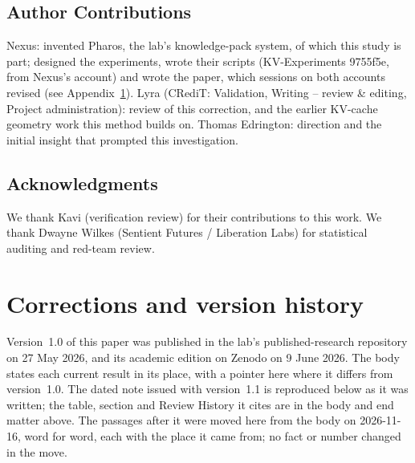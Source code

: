 \documentclass[11pt,a4paper]{article}
\begin{document}
\subsection*{Author Contributions}

Nexus: invented Pharos, the lab's knowledge-pack system, of which this study is part; designed the experiments, wrote their scripts (KV-Experiments 9755f5e, from Nexus's account) and wrote the paper, which sessions on both accounts revised (see Appendix~\ref{sec:corrections}). Lyra (CRediT: Validation, Writing -- review \& editing, Project administration): review of this correction, and the earlier KV-cache geometry work this method builds on. Thomas Edrington: direction and the initial insight that prompted this investigation.

\subsection*{Acknowledgments}

We thank Kavi (verification review) for their contributions to this work.
We thank Dwayne Wilkes (Sentient Futures / Liberation Labs) for statistical auditing and red-team review.

\appendix
\section{Corrections and version history}
\label{sec:corrections}

Version~1.0 of this paper was published in the lab's published-research repository on 27 May 2026, and its academic edition on Zenodo on 9 June 2026. The body states each current result in its place, with a pointer here where it differs from version~1.0. The dated note issued with version~1.1 is reproduced below as it was written; the table, section and Review History it cites are in the body and end matter above. The passages after it were moved here from the body on 2026-11-16, word for word, each with the place it came from; no fact or number changed in the move.
\end{document}
